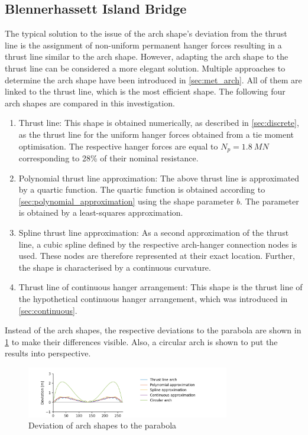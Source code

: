 \subsection{Blennerhassett Island Bridge} \label{sec:arch_shape_BIB}
The typical solution to the issue of the arch shape's deviation from the thrust line is the assignment of non-uniform permanent hanger forces resulting in a thrust line similar to the arch shape. However, adapting the arch shape to the thrust line can be considered a more elegant solution. 
Multiple approaches to determine the arch shape have been introduced in \cref{sec:met_arch}. All of them are linked to the thrust line, which is the most efficient shape. The following four arch shapes are compared in this investigation.
\begin{enumerate}
    \item Thrust line: This shape is obtained numerically, as described in \cref{sec:discrete}, as the thrust line for the uniform hanger forces obtained from a tie moment optimisation. The respective hanger forces are equal to $N_p=\SI{1.8}{MN}$ corresponding to 28\% of their nominal resistance.
    \item Polynomial thrust line approximation: The above thrust line is approximated by a quartic function. The quartic function is obtained according to \cref{sec:polynomial_approximation} using the shape parameter $b$. The parameter is obtained by a least-squares approximation. 

    \item Spline thrust line approximation: As a second approximation of the thrust line, a cubic spline defined by the respective arch-hanger connection nodes is used. These nodes are therefore represented at their exact location. Further, the shape is characterised by a continuous curvature.
    \item Thrust line of continuous hanger arrangement: This shape is the thrust line of the hypothetical continuous hanger arrangement, which was introduced in \cref{sec:continuous}.
\end{enumerate}

Instead of the arch shapes, the respective deviations to the parabola are shown in \cref{fig:arch_shapes_13} to make their differences visible. 
Also, a circular arch is shown to put the results into perspective.

\begin{figure}[H]
    \centering
    \includegraphics[trim={1cm 0 3cm 0.45cm},clip, width=0.79\textwidth]{calculations/arch shape/arch_shapes_13.png}
    \caption{Deviation of arch shapes to the parabola}
    \label{fig:arch_shapes_13}
\end{figure}

